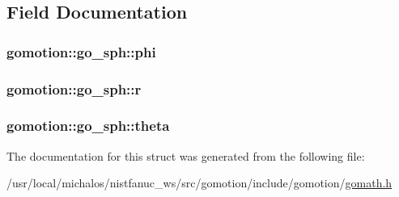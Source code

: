 \subsection{Field Documentation}
\hypertarget{structgomotion_1_1go__sph_afd0964fc26067714ed465d2ea36ea90d}{
\subsubsection[{phi}]{ gomotion\-::go\-\_\-sph\-::phi}}\label{structgomotion_1_1go__sph_afd0964fc26067714ed465d2ea36ea90d}
\hypertarget{structgomotion_1_1go__sph_a44361cc285fdc563622c7f74121bc5d8}{
\subsubsection[{r}]{ gomotion\-::go\-\_\-sph\-::r}}\label{structgomotion_1_1go__sph_a44361cc285fdc563622c7f74121bc5d8}
\hypertarget{structgomotion_1_1go__sph_ad922b1e1556ad041c62ae71e2335e688}{
\subsubsection[{theta}]{ gomotion\-::go\-\_\-sph\-::theta}}\label{structgomotion_1_1go__sph_ad922b1e1556ad041c62ae71e2335e688}


The documentation for this struct was generated from the following file\-:\begin{DoxyCompactItemize}
\item 
/usr/local/michalos/nistfanuc\-\_\-ws/src/gomotion/include/gomotion/\hyperlink{gomath_8h}{gomath.\-h}\end{DoxyCompactItemize}
